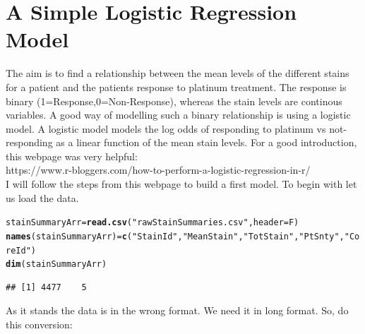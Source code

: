 \documentclass[a4paper]{article}\usepackage[]{graphicx}\usepackage[]{color}
\makeatletter
\newcommand{\hlstr}[1]{\textcolor[rgb]{0.192,0.494,0.8}{#1}}%
\newcommand{\hlstd}[1]{\textcolor[rgb]{0.345,0.345,0.345}{#1}}%
\newcommand{\hlkwb}[1]{\textcolor[rgb]{0.69,0.353,0.396}{#1}}%
\newcommand{\hlkwc}[1]{\textcolor[rgb]{0.333,0.667,0.333}{#1}}%
\newcommand{\hlkwd}[1]{\textcolor[rgb]{0.737,0.353,0.396}{\textbf{#1}}}%
\newenvironment{kframe}{%
 \def\at@end@of@kframe{}%
 \ifinner\ifhmode%
  \def\at@end@of@kframe{\end{minipage}}%
  \begin{minipage}{\columnwidth}%
 \fi\fi%
 \def\FrameCommand##1{\hskip\@totalleftmargin \hskip-\fboxsep
 \colorbox{shadecolor}{##1}\hskip-\fboxsep
     \hskip-\linewidth \hskip-\@totalleftmargin \hskip\columnwidth}%
 \MakeFramed {\advance\hsize-\width
   \@totalleftmargin\z@ \linewidth\hsize
   \@setminipage}}%
 {\par\unskip\endMakeFramed%
 \at@end@of@kframe}
\newenvironment{knitrout}{}{} %
\makeatother
\begin{document}
\section{A Simple Logistic Regression Model}
The aim is to find a relationship between the mean levels of the different stains for a patient and the patients response to platinum treatment. The response is binary (1=Response,0=Non-Response), whereas the stain levels are continous variables. A good way of modelling such a binary relationship is using a logistic model. A logistic model models the log odds of responding to platinum vs not-responding as a linear function of the mean stain levels. For a good introduction, this webpage was very helpful:\\
https://www.r-bloggers.com/how-to-perform-a-logistic-regression-in-r/
\\
I will follow the steps from this webpage to build a first model.
To begin with let us load the data.
\begin{knitrout}
\color{fgcolor}\begin{kframe}
\begin{alltt}
\hlstd{stainSummaryArr} \hlkwb{=} \hlkwd{read.csv}\hlstd{(}\hlstr{"rawStainSummaries.csv"}\hlstd{,}\hlkwc{header}\hlstd{=F)}
\hlkwd{names}\hlstd{(stainSummaryArr)} \hlkwb{=} \hlkwd{c}\hlstd{(}\hlstr{"StainId"}\hlstd{,}\hlstr{"MeanStain"}\hlstd{,}\hlstr{"TotStain"}\hlstd{,}\hlstr{"PtSnty"}\hlstd{,}\hlstr{"CoreId"}\hlstd{)}
\hlkwd{dim}\hlstd{(stainSummaryArr)}
\end{alltt}
\begin{verbatim}
## [1] 4477    5
\end{verbatim}
\end{kframe}
\end{knitrout}
As it stands the data is in the wrong format. We need it in long format. So, do this conversion:
\end{document}
